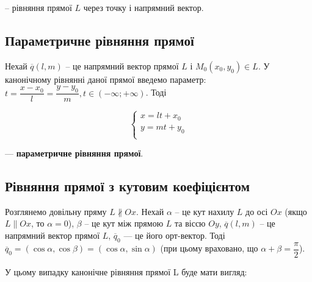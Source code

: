 	\begin{center}
	\end{center}
	 -- рівняння прямої $L$ через точку і напрямний вектор.


\subsection{Параметричне рівняння прямої}

Нехай $\overline{q}(l, m)$ -- це напрямний вектор прямої $L$ і $M_0(x_0, y_0) \in L$. У канонічному
рівнянні даної прямої введемо параметр: $t = \dfrac{x-x_0}{l} = \dfrac{y-y_0}{m}, t \in (-\infty; +\infty)$. Тоді

$$\left\{\begin{array}{l}
	x = lt + x_0 \\
	y = mt + y_0 \\
\end{array}\right.$$

--- \textbf{параметричне рівняння прямої}.

\subsection{Рівняння прямої з кутовим коефіцієнтом}

\noindent\parbox{3.5cm}{}
\parbox{\textwidth - 3.6cm}{
	Розглянемо довільну пряму $L \nparallel Ox$. Нехай $\alpha$ -- це кут нахилу $L$
	до осі $Ox$ (якщо $L \parallel Ox$, то $\alpha = 0$), $\beta$ -- це кут між прямою $L$
	та віссю $Oy$, $\overline{q}(l,m)$ -- це напрямний вектор прямої $L$, $\overline{q}_0$ ---
	це його орт-вектор. Тоді $\overline{q}_0 = (\cos \alpha, \cos \beta) = (\cos \alpha, \sin \alpha)$ (при
	цьому враховано, що $\alpha + \beta = \dfrac{\pi}{2}$). 
}

У цьому випадку канонічне рівняння прямої L буде мати вигляд:

